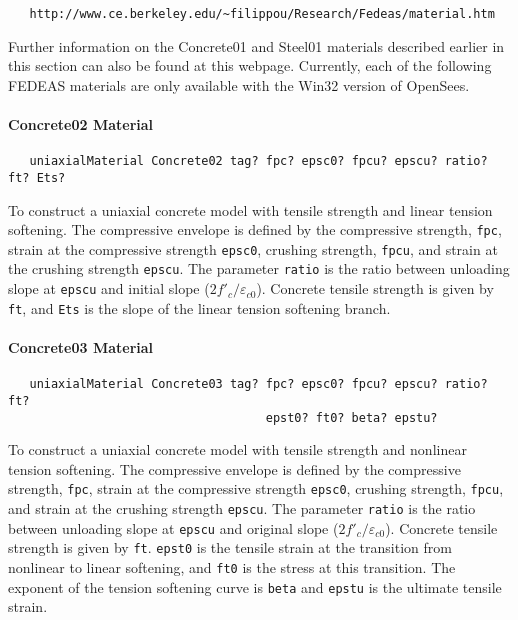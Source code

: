 \documentclass[12pt]{article}
\begin{document}
{\sf\small
\begin{verbatim}
   http://www.ce.berkeley.edu/~filippou/Research/Fedeas/material.htm
\end{verbatim}
}

\noindent Further information on the Concrete01 and Steel01 materials
described earlier in this section can also be found at this webpage.
Currently, each of the following FEDEAS materials are only available with
the Win32 version of OpenSees.

\paragraph{Concrete02 Material}
{\sf\small
\begin{verbatim}
   uniaxialMaterial Concrete02 tag? fpc? epsc0? fpcu? epscu? ratio? ft? Ets?
\end{verbatim}
}

To construct a uniaxial concrete model with tensile strength and linear
tension softening. The compressive envelope is defined by the compressive
strength, {\tt fpc},
strain at the compressive strength {\tt epsc0}, crushing strength, {\tt fpcu},
and strain at the crushing strength {\tt epscu}. The
parameter {\tt ratio} is the ratio between unloading slope at {\tt epscu}
and initial slope
($2f'_c/\varepsilon_{c0}$). Concrete tensile strength is given by {\tt ft},
and {\tt Ets}
is the slope of the linear tension softening branch. 

\paragraph{Concrete03 Material}
{\sf\small
\begin{verbatim}
   uniaxialMaterial Concrete03 tag? fpc? epsc0? fpcu? epscu? ratio? ft?
                                    epst0? ft0? beta? epstu?
\end{verbatim}
}

To construct a uniaxial concrete model with tensile strength and nonlinear
tension softening. The compressive envelope is defined by the compressive
strength, {\tt fpc}, strain at the compressive strength {\tt epsc0},
crushing strength, {\tt fpcu}, and strain at the crushing strength
{\tt epscu}. The parameter {\tt ratio} is the ratio between unloading slope
at {\tt epscu} and original slope ($2f'_c/\varepsilon_{c0}$). Concrete
tensile strength is given by {\tt ft}. {\tt epst0} is the tensile strain at
the transition from nonlinear to linear softening, and {\tt ft0} is the
stress at this transition. The exponent of the tension softening curve is
{\tt beta} and
{\tt epstu} is the ultimate tensile strain.
\end{document}
